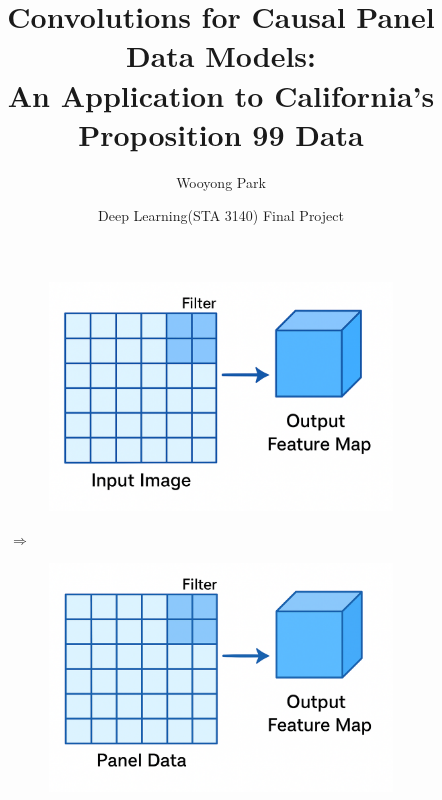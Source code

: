 \documentclass[12pt]{article}
\title{Convolutions for Causal Panel Data Models:\\
	An Application to California's Proposition 99 Data
}
\author{
	Wooyong Park\\
	\multicolumn{1}{p{.7\textwidth}}{\centering Yonsei University} 
}
\date{Deep Learning(STA 3140) Final Project}
\begin{document}
	\begin{singlespace}
		\maketitle
	\end{singlespace}
	
	\begin{figure}[htbp]
		\centering
		\begin{subfigure}[c]{0.3\textwidth}
			\includegraphics[width=\textwidth]{../figures/intro1.png}
		\end{subfigure}
		\hspace{10pt}
		{\Large $\Longrightarrow$}
		\hspace{10pt}
		\begin{subfigure}[c]{0.3\textwidth}
			\includegraphics[width=\textwidth]{../figures/intro2.png}
		\end{subfigure}
	\end{figure}
		
\end{document}
